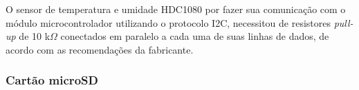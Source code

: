     \begin{figure}[h!]
            \captionsetup{width=7cm}
   \end{figure}  

\newpage


O sensor de temperatura e umidade HDC1080 por fazer sua comunicação com o módulo microcontrolador utilizando o protocolo \gls{I2C}, necessitou de resistores \textit{pull-up} de 10 k$\Omega$ conectados em paralelo a cada uma de suas linhas de dados, de acordo com as recomendações da fabricante.

    \begin{figure}[h!]
            \captionsetup{width=7cm}
   \end{figure}  




\subsubsection{Cartão microSD}

